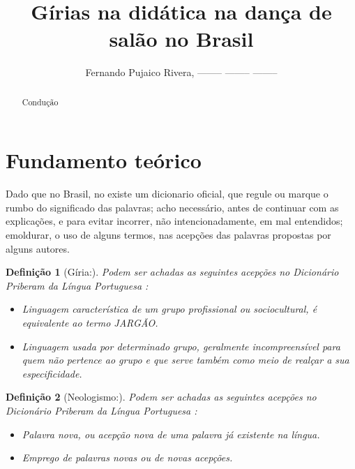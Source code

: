 \documentclass[a4paper,10pt]{article}
\title{Gírias na didática na dança de salão no Brasil}
\author{Fernando Pujaico Rivera, -------- -------- --------}
\newtheorem{mydefinition}{Definição}
\begin{document}
\maketitle

\begin{abstract}
Condução
\end{abstract}



\section{Fundamento teórico}

Dado que no Brasil, no existe um dicionario oficial, 
que regule ou marque o rumbo do significado das palavras;
acho necessário, antes de continuar com as explicações, 
e para evitar incorrer, não intencionadamente, em mal entendidos;
emoldurar, o uso de alguns termos, nas acepções das palavras propostas por alguns autores.
\begin{mydefinition}[Gíria:] 
\label{def:Giria}
Podem ser achadas as seguintes acepções no Dicionário Priberam da Língua Portuguesa \cite{priberamgiria}:
\begin{itemize}
\item Linguagem característica de um grupo profissional ou sociocultural, é equivalente ao termo JARGÃO.
\item Linguagem usada por determinado grupo, 
geralmente incompreensível para quem não pertence ao grupo e que serve também como meio de realçar a sua especificidade.
\end{itemize}
\end{mydefinition}

\begin{mydefinition}[Neologismo:] 
\label{def:Neologismo}
Podem ser achadas as seguintes acepções no Dicionário Priberam da Língua Portuguesa \cite{priberamneologismo}:
\begin{itemize}
\item Palavra nova, ou acepção nova de uma palavra já existente na língua.
\item Emprego de palavras novas ou de novas acepções.
\end{itemize}
\end{mydefinition}
\end{document}
